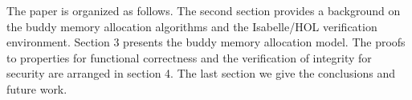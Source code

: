 The paper is organized as follows. The second section provides a background on the buddy memory allocation algorithms and the Isabelle/HOL verification environment. Section 3 presents the buddy memory allocation model. The proofs to properties for functional correctness and the verification of integrity for security are arranged in section 4. The last section we give the conclusions and future work.
